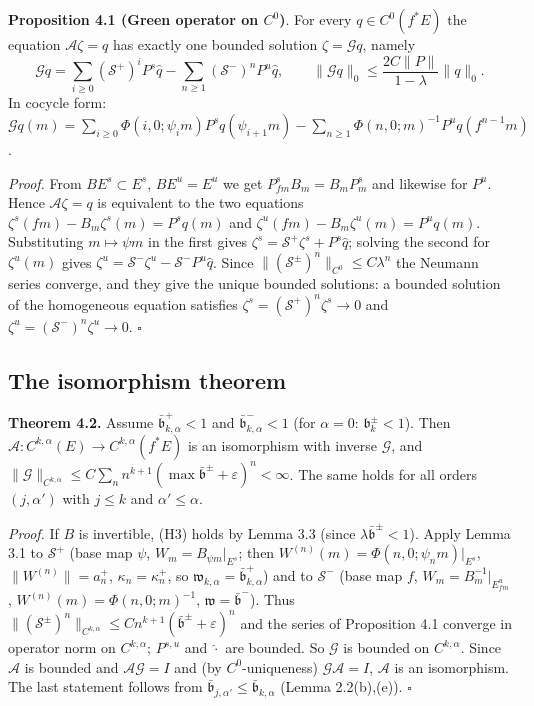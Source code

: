 \documentclass[11pt,a4paper]{article}
\theoremstyle{plain}
\theoremstyle{definition}
\theoremstyle{remark}
\numberwithin{equation}{section}
\numberwithin{figure}{section}
\begin{document}
\textbf{Proposition 4.1 (Green operator on $C^0$)}. For every $q\in C^0(f^*E)$ the equation $\mathcal A\zeta=q$ has exactly one bounded solution $\zeta=\mathcal Gq$, namely
\[
\mathcal Gq=\sum_{i\ge0}(\mathcal S^+)^iP^s\hat q-\sum_{n\ge1}(\mathcal S^-)^nP^u\hat q,\qquad\|\mathcal Gq\|_0\le\frac{2C\|P\|}{1-\lambda}\|q\|_0 .
\]
In cocycle form: $\mathcal Gq(m)=\sum_{i\ge0}\Phi(i,0;\psi_im)P^sq(\psi_{i+1}m)-\sum_{n\ge1}\Phi(n,0;m)^{-1}P^uq(f^{n-1}m)$.

\textit{Proof.} From $BE^s\subset E^s$, $BE^u=E^u$ we get $P^s_{fm}B_m=B_mP^s_m$ and likewise for $P^u$. Hence $\mathcal A\zeta=q$ is equivalent to the two equations $\zeta^s(fm)-B_m\zeta^s(m)=P^sq(m)$ and $\zeta^u(fm)-B_m\zeta^u(m)=P^uq(m)$. Substituting $m\mapsto\psi m$ in the first gives $\zeta^s=\mathcal S^+\zeta^s+P^s\hat q$; solving the second for $\zeta^u(m)$ gives $\zeta^u=\mathcal S^-\zeta^u-\mathcal S^-P^u\hat q$. Since $\|(\mathcal S^\pm)^n\|_{C^0}\le C\lambda^n$ the Neumann series converge, and they give the unique bounded solutions: a bounded solution of the homogeneous equation satisfies $\zeta^s=(\mathcal S^+)^n\zeta^s\to0$ and $\zeta^u=(\mathcal S^-)^n\zeta^u\to0$. $\square$

\subsection{The isomorphism theorem}

\textbf{Theorem 4.2.} Assume $\bar{\mathfrak b}^+_{k,\alpha}<1$ and $\bar{\mathfrak b}^-_{k,\alpha}<1$ (for $\alpha=0$: $\mathfrak b^\pm_k<1$). Then $\mathcal A:C^{k,\alpha}(E)\to C^{k,\alpha}(f^*E)$ is an isomorphism with inverse $\mathcal G$, and $\|\mathcal G\|_{C^{k,\alpha}}\le C\sum_nn^{k+1}(\max\bar{\mathfrak b}^\pm+\varepsilon)^n<\infty$. The same holds for all orders $(j,\alpha')$ with $j\le k$ and $\alpha'\le\alpha$.

\textit{Proof.} If $B$ is invertible, (H3) holds by Lemma 3.3 (since $\lambda\bar{\mathfrak b}^\pm<1$). Apply Lemma 3.1 to $\mathcal S^+$ (base map $\psi$, $W_m=B_{\psi m}|_{E^s}$; then $W^{(n)}(m)=\Phi(n,0;\psi_nm)|_{E^s}$, $\|W^{(n)}\|=a^+_n$, $\kappa_n=\kappa^+_n$, so $\mathfrak w_{k,\alpha}=\bar{\mathfrak b}^+_{k,\alpha}$) and to $\mathcal S^-$ (base map $f$, $W_m=B_m^{-1}|_{E^u_{fm}}$, $W^{(n)}(m)=\Phi(n,0;m)^{-1}$, $\mathfrak w=\bar{\mathfrak b}^-$). Thus $\|(\mathcal S^\pm)^n\|_{C^{k,\alpha}}\le Cn^{k+1}(\bar{\mathfrak b}^\pm+\varepsilon)^n$ and the series of Proposition 4.1 converge in operator norm on $C^{k,\alpha}$; $P^{s,u}$ and $\hat\cdot$ are bounded. So $\mathcal G$ is bounded on $C^{k,\alpha}$. Since $\mathcal A$ is bounded and $\mathcal A\mathcal G=I$ and (by $C^0$-uniqueness) $\mathcal G\mathcal A=I$, $\mathcal A$ is an isomorphism. The last statement follows from $\bar{\mathfrak b}_{j,\alpha'}\le\bar{\mathfrak b}_{k,\alpha}$ (Lemma 2.2(b),(e)). $\square$
\end{document}
